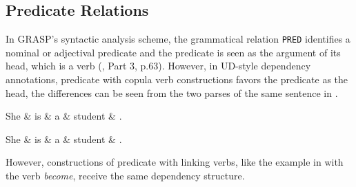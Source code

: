 \subsection{Predicate Relations}

In GRASP's syntactic analysis scheme, the grammatical relation \texttt{PRED} identifies a nominal or adjectival predicate and the predicate is seen as the argument of its head, which is a verb (\cite{Macwhinney2000}, Part 3, p.63). However, in UD-style dependency annotations, predicate with copula verb constructions favors the predicate as the head, the differences can be seen from the two parses of the same sentence in .\\

\begin{minipage}[b]{0.5\linewidth}
\begin{dependency}
	\begin{deptext}[column sep=0.5cm]
	She \& is \& a \& student \& .\\
	\end{deptext}
\end{dependency}
\end{minipage}
\hfill
\begin{minipage}[b]{0.5\linewidth}
\begin{dependency}
	\begin{deptext}[column sep=0.5cm]
	She \& is \& a \& student \& .\\
	\end{deptext}
\end{dependency}
\end{minipage}\label{fig:copula}
\clearpage

However, constructions of predicate with linking verbs, like the example in  with the verb \emph{become}, receive the same dependency structure.\\

